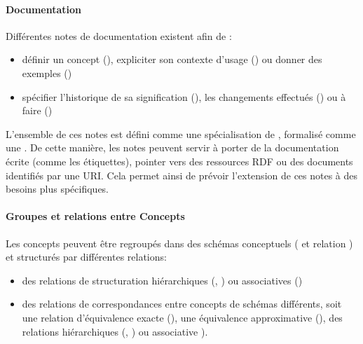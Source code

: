 \paragraph{Documentation}
Différentes notes de documentation existent afin de :
\begin{itemize}
	\item définir un concept (), expliciter son contexte d'usage () ou donner des exemples ()
	\item spécifier l'historique de sa signification (), les changements effectués () ou à faire ()
\end{itemize}
L'ensemble de ces notes est défini comme une spécialisation de , formalisé comme une . 
De cette manière, les notes peuvent servir à porter de la documentation écrite (comme les étiquettes), pointer vers des ressources RDF ou des documents identifiés par une URI. 
Cela permet ainsi de prévoir l'extension de ces notes à des besoins plus spécifiques.


\paragraph{Groupes et relations entre Concepts}
Les concepts peuvent être regroupés dans des schémas conceptuels ( et relation ) et structurés par différentes relations:
\begin{itemize}
	\item des relations de structuration hiérarchiques (, ) ou associatives ()
	\item des relations de correspondances entre concepts de schémas différents, soit une relation d'équivalence exacte (), une équivalence approximative (), des relations hiérarchiques (, ) ou associative ).
\end{itemize}



